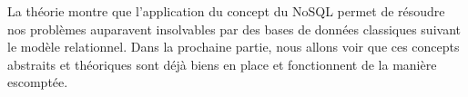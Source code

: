 La théorie montre que l'application du concept du NoSQL permet de résoudre nos problèmes auparavent insolvables par des bases de données classiques suivant le modèle relationnel. Dans la prochaine partie, nous allons voir que ces concepts abstraits et théoriques sont déjà biens en place et fonctionnent de la manière escomptée.
